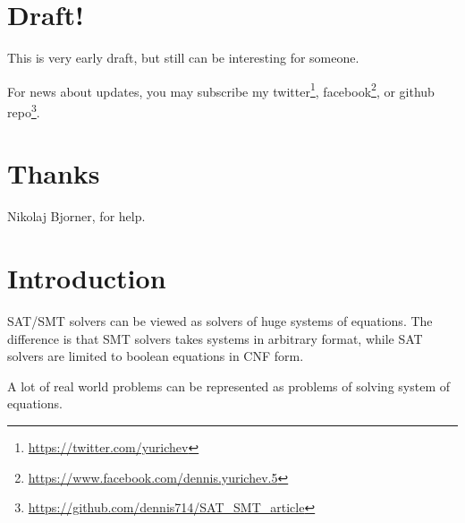 \section{Draft!}

This is very early draft, but still can be interesting for someone.

For news about updates, you may subscribe my 
twitter\footnote{\url{https://twitter.com/yurichev}}, 
facebook\footnote{\url{https://www.facebook.com/dennis.yurichev.5}}, 
or github repo\footnote{\url{https://github.com/dennis714/SAT_SMT_article}}.

\section{Thanks}

Nikolaj Bjorner, for help.

\section{Introduction}

\ac{SAT}/\ac{SMT} solvers can be viewed as solvers of huge systems of equations.
The difference is that \ac{SMT} solvers takes systems in arbitrary format,
while \ac{SAT} solvers are limited to boolean equations in CNF form.

A lot of real world problems can be represented as problems of solving system of equations.

